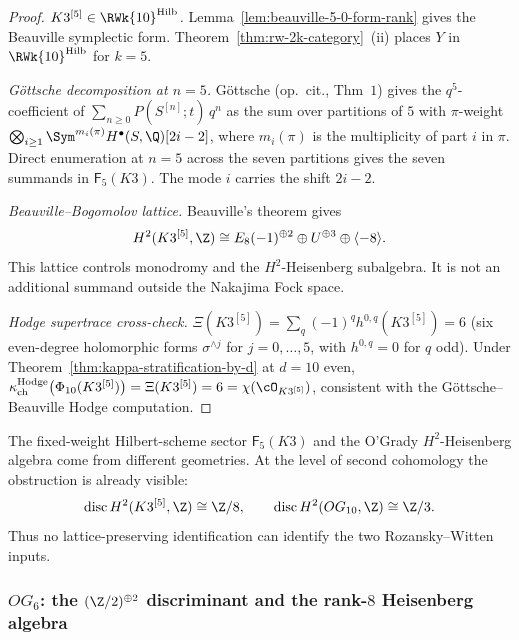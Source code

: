 \begin{proof}
\emph{\(K3^{[5]}\in\RWk{10}^{\mathrm{Hilb}}\).}
Lemma~\ref{lem:beauville-5-0-form-rank} gives the Beauville symplectic
form.
Theorem~\ref{thm:rw-2k-category}~(ii) places $Y$ in
$\RWk{10}^{\mathrm{Hilb}}$ for $k = 5$.

\emph{G\"ottsche decomposition at $n = 5$.}
G\"ottsche (op.\ cit., Thm~$1$) gives the $q^5$-coefficient of
$\sum_{n \ge 0} P(S^{[n]}; t)\, q^n$ as the sum over partitions of
$5$ with \(\pi\)-weight
\(\bigotimes_{i \ge 1}\Sym^{m_i(\pi)}H^\bullet(S,\Q)[2i-2]\), where
\(m_i(\pi)\) is the multiplicity of part \(i\) in \(\pi\). Direct
enumeration at \(n=5\) across the seven partitions gives the seven summands
in \(\mathsf F_5(K3)\). The mode \(i\) carries the shift \(2i-2\).

\emph{Beauville--Bogomolov lattice.}
Beauville's theorem gives
\[
H^2(K3^{[5]},\Z)\cong E_8(-1)^{\oplus2}\oplus U^{\oplus3}
\oplus\langle-8\rangle .
\]
This lattice controls monodromy and the \(H^2\)-Heisenberg subalgebra. It is
not an additional summand outside the Nakajima Fock space.

\emph{Hodge supertrace cross-check.}
$\Xi(K3^{[5]}) = \sum_q (-1)^q h^{0,q}(K3^{[5]}) = 6$ \textup{(}six
even-degree holomorphic forms $\sigma^{\wedge j}$ for
$j = 0, \ldots, 5$, with $h^{0,q} = 0$ for $q$ odd\textup{).} Under
Theorem~\ref{thm:kappa-stratification-by-d} at $d = 10$ even,
$\kappa_{\mathrm{ch}}^{\mathrm{Hodge}}\bigl(\Phi_{10}(K3^{[5]})\bigr) =
\Xi(K3^{[5]}) = 6 = \chi(\cO_{K3^{[5]}})$, consistent with the
G\"ottsche--Beauville Hodge computation.
\end{proof}

\begin{remark}
\label{rem:hilb5-vs-og10}
%
The fixed-weight Hilbert-scheme sector \(\mathsf F_5(K3)\) and the
O'Grady \(H^2\)-Heisenberg algebra come from different geometries. At the
level of second cohomology the obstruction is already visible:
\[
\operatorname{disc}H^2(K3^{[5]},\Z)\cong\Z/8,\qquad
\operatorname{disc}H^2(OG_{10},\Z)\cong\Z/3 .
\]
Thus no lattice-preserving identification can identify the two
Rozansky--Witten inputs.
\end{remark}

\subsubsection{\texorpdfstring{$OG_6$}{OG-6}: the \texorpdfstring{$(\Z/2)^{\oplus 2}$}{(Z/2)-(+) 2}
 discriminant and the rank-\texorpdfstring{$8$}{8} Heisenberg algebra}
\label{subsubsec:phi-6-og6-explicit}

